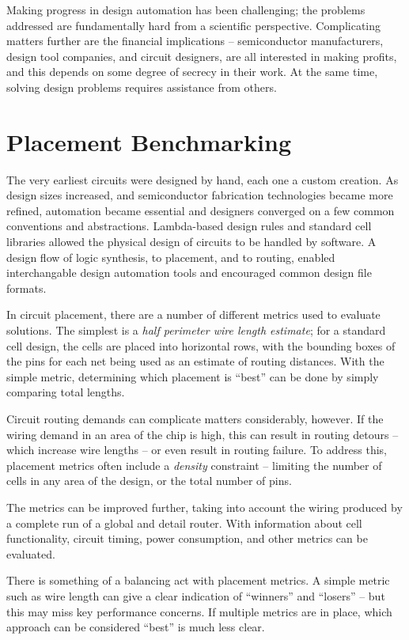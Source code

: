 \documentclass[sigconf]{acmart}
\begin{document}
Making progress in design automation has been challenging;
the problems addressed are fundamentally hard from a scientific
perspective. Complicating matters further are the financial
implications -- semiconductor manufacturers, design tool companies,
and circuit designers, are all interested in making profits, and
this depends on some degree of secrecy in their work.  At the
same time, solving design problems requires assistance from
others.
\fi


\section{Placement Benchmarking}

The very earliest circuits were designed by hand, each one a custom
creation. As design sizes increased, and semiconductor fabrication
technologies became more refined, automation became essential and
designers converged on a few common conventions and
abstractions. Lambda-based design rules and standard cell
libraries\cite{Mead93} allowed the physical design of circuits to be
handled by software.  A design flow of logic synthesis, to placement,
and to routing, enabled interchangable design automation tools and
encouraged common design file formats.

In circuit placement, there are a number of different metrics
used to evaluate solutions.  The simplest is a {\em half perimeter
  wire length estimate}; for a standard cell design, the
cells are placed into horizontal rows, with the bounding boxes
of the pins for each net being used as an estimate of routing
distances.  With the simple metric, determining which placement
is ``best'' can be done by simply comparing total lengths.

Circuit routing demands can complicate matters considerably, however.
If the wiring demand in an area of the chip is high, this can
result in routing detours -- which increase wire lengths -- or
even result in routing failure.  To address this, placement
metrics often include a {\em density} constraint -- limiting the
number of cells in any area of the design, or the total number of
pins.

The metrics can be improved further, taking into account the
wiring produced by a complete run of a global and detail router.
With information about cell functionality, circuit timing, power
consumption, and other metrics can be evaluated.

There is something of a balancing act with placement metrics.
A simple metric such as wire length can give a clear indication
of ``winners'' and ``losers'' -- but this may miss key performance
concerns.  If multiple metrics are in place, which approach
can be considered ``best'' is much less clear.
\end{document}
